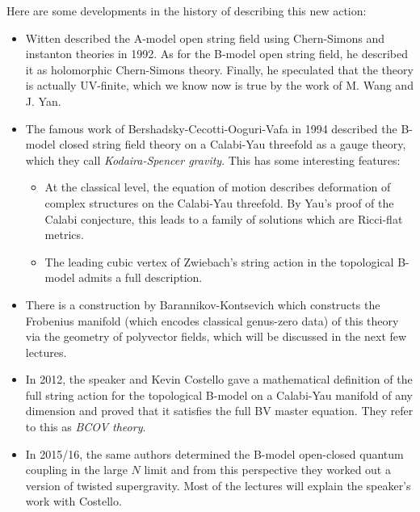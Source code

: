 \documentclass[article,10pt,oneside,oldfontcommands]{memoir}
\theoremstyle{definition}
\theoremstyle{remark}
\theoremstyle{plain}
\theoremstyle{definition}
\theoremstyle{remark}
\newcommand{\1}{\mathbf{1}}
\newcommand{\2}{\mathbf{2}}
\newcommand{\3}{\mathbf{3}}
\begin{document}
Here are some developments in the history of describing this new action:
\begin{itemize}
    \item Witten described the A-model open string field using Chern-Simons and instanton theories in 1992. As for the B-model open string field, he described it as holomorphic Chern-Simons theory. Finally, he speculated that the theory is actually UV-finite, which we know now is true by the work of M. Wang and J. Yan.
    \item The famous work of Bershadsky-Cecotti-Ooguri-Vafa in 1994 described the B-model closed string field theory on a Calabi-Yau threefold as a gauge theory, which they call \textit{Kodaira-Spencer gravity}. This has some interesting features:
    \begin{itemize}
        \item At the classical level, the equation of motion describes deformation of complex structures on the Calabi-Yau threefold. By Yau's proof of the Calabi conjecture, this leads to a family of solutions which are Ricci-flat metrics.
        \item The leading cubic vertex of Zwiebach's string action in the topological B-model admits a full description.
    \end{itemize}
    \item There is a construction by Barannikov-Kontsevich which constructs the Frobenius manifold (which encodes classical genus-zero data) of this theory via the geometry of polyvector fields, which will be discussed in the next few lectures.
    \item In 2012, the speaker and Kevin Costello gave a mathematical definition of the full string action for the topological B-model on a Calabi-Yau manifold of any dimension and proved that it satisfies the full BV master equation. They refer to this as \textit{BCOV theory}.
    \item In 2015/16, the same authors determined the B-model open-closed quantum coupling in the large \(N\) limit and from this perspective they worked out a version of twisted supergravity. Most of the lectures will explain the speaker's work with Costello.
\end{itemize}
\end{document}

